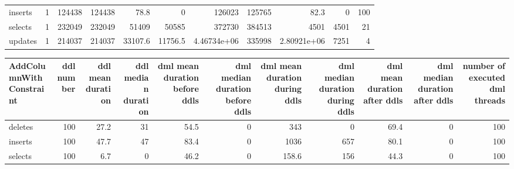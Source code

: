 \begin{tabular}{lrrrrrrrrrr}
 inserts             &            1 &              124438 &                124438 &                            78.8 &                               0   &                126023           &                  125765           &                   82.3         &                                0 &                              100 \\
 selects             &            1 &              232049 &                232049 &                         51409   &                           50585   &                372730           &                  384513           &                 4501           &                             4501 &                               21 \\
 updates             &            1 &              214037 &                214037 &                         33107.6 &                           11756.5 &                     4.46734e+06 &                  335998           &                    2.80921e+06 &                             7251 &                                4 \\
\hline
\end{tabular}\begin{tabular}{lrrrrrrrrrr}
\hline
 AddColumnWithConstraint   &   ddl number &   ddl mean duration &   ddl median duration &   dml mean duration before ddls &   dml median duration before ddls &   dml mean duration during ddls &   dml median duration during ddls &   dml mean duration after ddls &   dml median duration after ddls &   number of executed dml threads \\
\hline
 deletes                   &          100 &                27.2 &                    31 &                            54.5 &                                 0 &                           343   &                                 0 &                           69.4 &                                0 &                              100 \\
 inserts                   &          100 &                47.7 &                    47 &                            83.4 &                                 0 &                          1036   &                               657 &                           80.1 &                                0 &                              100 \\
 selects                   &          100 &                 6.7 &                     0 &                            46.2 &                                 0 &                           158.6 &                               156 &                           44.3 &                                0 &                              100 \\

\end{tabular}
